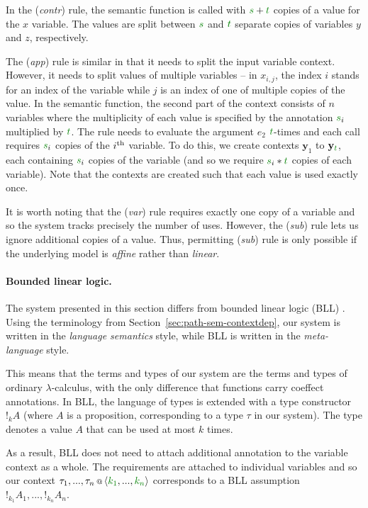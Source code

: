 %
In the (\emph{contr}) rule, the semantic function is called with $\cclrd{s}+\cclrd{t}$ copies of
a value for the $x$ variable. The values are split between $\cclrd{s}$ and $\cclrd{t}$ separate
copies of variables $y$ and $z$, respectively.

The (\emph{app}) rule is similar in that it needs to split the input variable context. However,
it needs to split values of multiple variables -- in $x_{i,j}$, the index $i$ stands for an
index of the variable while $j$ is an index of one of multiple copies of the value. In the
semantic function, the second
part of the context consists of $n$ variables where the multiplicity of each value is specified 
by the annotation $\cclrd{s}_i$ multiplied by $\cclrd{t}$. The rule needs to evaluate the argument 
$e_2$ $\cclrd{t}$-times and each call requires $\cclrd{s}_i$ copies of the $i^\textnormal{th}$ 
variable. To do this, we create contexts $\mathbf{y}_1$ to $\mathbf{y}_{\cclrd{t}}$, each containing
$\cclrd{s}_i$ copies of the variable (and so we require $\cclrd{s}_i\ast\cclrd{t}$ copies of each 
variable). Note that the contexts are created such that each value is used exactly once.

It is worth noting that the (\emph{var}) rule requires exactly one copy of a variable and so 
the system tracks precisely the number of uses. However, the (\emph{sub}) rule lets us 
ignore additional copies of a value. Thus, permitting (\emph{sub}) rule is only possible if the
underlying model is \emph{affine} rather than \emph{linear}.

\paragraph{Bounded linear logic.}
The system presented in this section differs from bounded linear logic (BLL) \cite{logic-bounded}.
Using the terminology from Section~\ref{sec:path-sem-contextdep}, our system is written in the
\emph{language semantics} style, while BLL is written in the \emph{meta-language} style.

This means that the terms and types of our system are the terms and types of ordinary 
$\lambda$-calculus, with the only difference that functions carry coeffect annotations.
In BLL, the language of types is extended with a type constructor $!_k A$ (where $A$ is
a proposition, corresponding to a type $\tau$ in our system). The type denotes a value
$A$ that can be used at most $k$ times. 

As a result, BLL does not need to attach additional annotation to the variable context 
as a whole. The requirements are attached to individual variables and so our context
$\coctx{\tau_1, ..., \tau_n}{\langle \cclrd{k_1}, ..., \cclrd{k_n}\rangle}$ corresponds
to a BLL assumption $!_{k_1} A_1, ..., !_{k_n} A_n$. 

